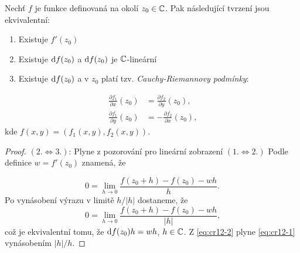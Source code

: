
\begin{theorem}\label{CR}
Nechť $f$ je funkce definovaná na okolí $z_0 \in \operatorname{\mathbb{C}}  $. Pak následující tvrzení jsou ekvivalentní:
\begin{enumerate}
    \item Existuje $f'(z_0)$ %
    \item Existuje $\mathop{}\!\mathrm{d} f(z_0)$ a $\mathop{}\!\mathrm{d} f(z_0)$ je $ \operatorname{\mathbb{C}}  $-lineární %
    \item Existuje $\mathop{}\!\mathrm{d} f(z_0)$ a v $z_0$ platí tzv. \emph{Cauchy-Riemannovy podmínky}: %
\end{enumerate}
\begin{align*}
\tag{CR}
\label{eqn:CR}
\frac{\partial f_1}{\partial x}(z_0) &= \frac{\partial f_2}{\partial y}(z_0)\text{, }\\
\frac{\partial f_1}{\partial y}(z_0) &= -\frac{\partial f_2}{\partial x}(z_0)\text{,}    
\end{align*}
kde $f(x,y) = (f_1(x,y),f_2(x,y))$.

\end{theorem}
\begin{proof}
$(2. \iff 3.)$: Plyne z pozorování pro lineární zobrazení %
\newline
$(1. \iff 2.)$ Podle definice $w = f'(z_0)$ znamená, že 

\begin{equation}\label{eq:cr12-1} 
0 = \lim_{h \to 0} {\frac{f(z_0+h)-f(z_0)-wh}{h}}\text{.} 
\end{equation}
Po vynásobení výrazu v limitě $h/|h|$ dostaneme, že
\begin{equation}\label{eq:cr12-2}
0 = \lim_{h \to 0} \frac{f(z_0+h)-f(z_0)-wh}{|h|}\text{,}
\end{equation}%
což je ekvivalentní tomu, že  $\mathop{}\!\mathrm{d} f(z_0)h=wh$, $h\in \operatorname{\mathbb{C}}  $. Z \cref{eq:cr12-2} plyne \cref{eq:cr12-1} vynásobením $|h|/h$.
\end{proof}

